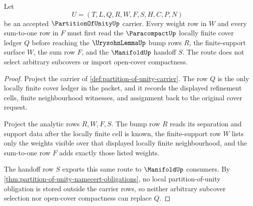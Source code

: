 \begin{theorem}
\label{thm:partition-of-unity-locally-finite-cover-route}
Let
$$
U=(T,L,Q,R,W,F,S,H,C,P,N)
$$
be an accepted $\PartitionOfUnityUp$ carrier. Every weight row in $W$ and
every sum-to-one row in $F$ must first read the $\ParacompactUp$ locally
finite cover ledger $Q$ before reaching the $\UrysohnLemmaUp$ bump rows $R$,
the finite-support surface $W$, the sum row $F$, and the $\ManifoldUp$
handoff $S$. The route does not select arbitrary subcovers or import
open-cover compactness.
\end{theorem}
\begin{proof}
Project the carrier of \autoref{def:partition-of-unity-carrier}. The row $Q$
is the only locally finite cover ledger in the packet, and it records the
displayed refinement cells, finite neighbourhood witnesses, and assignment
back to the original cover request.

Project the analytic rows $R,W,F,S$. The bump row $R$ reads its separation
and support data after the locally finite cell is known, the finite-support
row $W$ lists only the weights visible over that displayed locally finite
neighbourhood, and the sum-to-one row $F$ adds exactly those listed weights.

The handoff row $S$ exports this same route to $\ManifoldUp$ consumers.
By \autoref{thm:partition-of-unity-namecert-obligations}, no local
partition-of-unity obligation is stored outside the carrier rows, so neither
arbitrary subcover selection nor open-cover compactness can replace $Q$.
\end{proof}


\begin{closurestatus}{\PartitionOfUnityUp}
  \theoryclosure{\seedClosure}
  \formalstatus{\unformalizedV}
\end{closurestatus}

